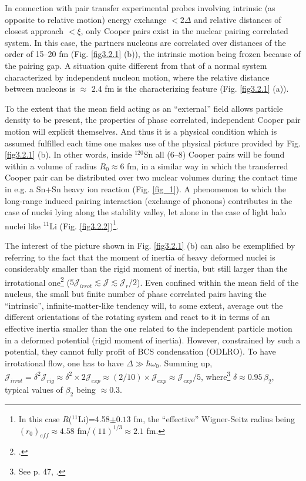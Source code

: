  In connection with pair transfer experimental probes involving intrinsic (as opposite to relative motion) energy exchange $<2\Delta$ and relative distances of closest approach $<\xi$, only Cooper pairs exist
 in the nuclear pairing correlated system.   In this case, the partners nucleons are correlated over distances of the order of 15--20 fm  (Fig. \ref{fig3.2.1} (b)), the intrinsic motion being frozen because of the pairing gap. A situation quite different from that of a normal system characterized by independent nucleon motion, where the relative distance between nucleons is  $\approx$ 2.4 fm is the characterizing feature  (Fig. \ref{fig3.2.1} (a)). 
 
 
 To the extent that the mean field acting as an ``external'' field allows particle density to be present, the properties of phase correlated, independent Cooper pair motion will explicit themselves. And thus it is a physical condition which is assumed fulfilled each time one  makes use of the physical picture provided by Fig. \ref{fig3.2.1} (b). In other words, inside $^{120}$Sn all (6--8) Cooper pairs will be found within a volume of radius $R_0\approx 6$ fm, in a similar way in which the transferred Cooper pair can be distributed over two nuclear volumes during the contact time  in e.g. a Sn+Sn heavy ion reaction (Fig. \ref{fig_1}).  A phenomenon to which the long-range induced pairing interaction (exchange of phonons) contributes in the case of  nuclei lying along the stability valley, let alone in the case of light halo nuclei like $^{11}$Li (Fig. \ref{fig3.2.2})\footnote{In this case $R$($^{11}$Li)=4.58$\pm0.13$ fm, the ``effective'' Wigner-Seitz radius being $(r_0)_{eff}\approx 4.58$ fm/$(11)^{1/3}\approx2.1$ fm.}.
 
 
 The interest of the  picture shown in Fig. \ref{fig3.2.1} (b) can also be exemplified by referring to the fact that the moment of inertia of heavy deformed nuclei is considerably smaller than the rigid moment of inertia, but still larger than the irrotational one\footnote{\cite{Bohr:75,Belyaev:59,Belyaev:13}.} ($5\mathcal J_{irrot}\lesssim\mathcal J\lesssim  \mathcal J_r/2$). Even confined within the mean field of the nucleus, the small but finite number   of phase correlated pairs having the ``intrinsic'', infinite-matter-like tendency will, to some extent, average out the different orientations of the rotating system and react to it in terms of an effective inertia smaller than the one related to the independent particle motion in a deformed potential (rigid moment of inertia). However, constrained by such a potential, they cannot fully profit of BCS  condensation (ODLRO). To have irrotational flow, one has to have $\Delta\gg \hbar\omega_0$. 	
 	Summing up, $\mathcal J_{irrot}=\delta^2\mathcal J_{rig}\approx\delta^2\times2\mathcal J_{exp}\approx(2/10)\times\mathcal J_{exp}\approx\mathcal J_{exp}/5$, where\footnote{See p. 47, \cite{Bohr:75}.} $\delta\approx0.95\,\beta_2$, typical values of $\beta_2$ being $\approx0.3$. 

